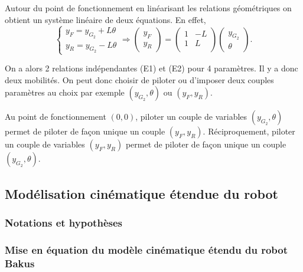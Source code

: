 \documentclass[11pt]{article}
\begin{document}
\begin{UPSTIcorrige}
Autour du point de fonctionnement en linéarisant les relations géométriques on obtient un système linéaire de deux équations. En effet, 
$$
\left\{
\begin{array}{l}
y_F=y_{G_2}+L\theta  \\
y_R=y_{G_2}-L\theta
\end{array}
\right.
\Rightarrow
\begin{pmatrix}
y_F \\ y_R
\end{pmatrix}
=\begin{pmatrix}
1 & -L \\ 
1 & L\\
\end{pmatrix}
\begin{pmatrix}
y_{{G_2}} \\
\theta
\end{pmatrix}.
$$

On a alors 2 relations indépendantes (E1) et (E2) pour 4 paramètres. Il y a donc deux mobilités. On peut donc choisir de piloter ou d'imposer deux couples paramètres au choix par exemple  $\left (y_{G_2},\theta \right)$ ou $\left(y_F,y_R\right)$.

Au point de fonctionnement $\left(0,0\right)$, piloter un couple de variables $\left (y_{G_2},\theta \right)$ permet de piloter de façon unique un couple $\left(y_F,y_R\right)$. Réciproquement, piloter un couple de variables $\left(y_F,y_R\right)$ permet de piloter de façon unique un couple $\left (y_{G_2},\theta \right)$.

\end{UPSTIcorrige}


\subsection{Modélisation cinématique étendue du robot}



\subsubsection{Notations et hypothèses}

\subsubsection{Mise en équation du modèle cinématique étendu du robot Bakus}
\end{document}
